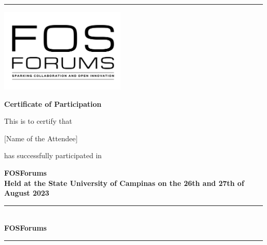 \documentclass[12pt,a4paper]{article}
\newcommand{\border}{
  \begin{center}
    \color{mypurple}
    \rule{\textwidth}{2px}
  \end{center}
}
\begin{document}
\pagestyle{empty}

\border

\begin{center}
  \includegraphics[width=6cm]{fosforums.png}
  
  {\LARGE \bfseries Certificate of Participation}
\end{center}

\vspace{0.5cm}

\begin{center}
  This is to certify that
  
  \vspace{0.5cm}
 
  {\Large \calligra \textcolor{mypurple}{[Name of the Attendee]}} %
  
  \vspace{0.5cm}
  
  has successfully participated in
  
  \vspace{0.5cm}

  {\Large \bfseries FOSForums} \\ %
  \vspace{0.5cm}
  {\small \bfseries Held at the State University of Campinas on the 26th and 27th of August 2023} %
  
\end{center}

\vspace{1cm}

\begin{center}
    \vspace{0.5cm}
    
    \rule{6cm}{0.4pt} \\
    \textbf{FOSForums}
  \end{center}

\border
\end{document}

